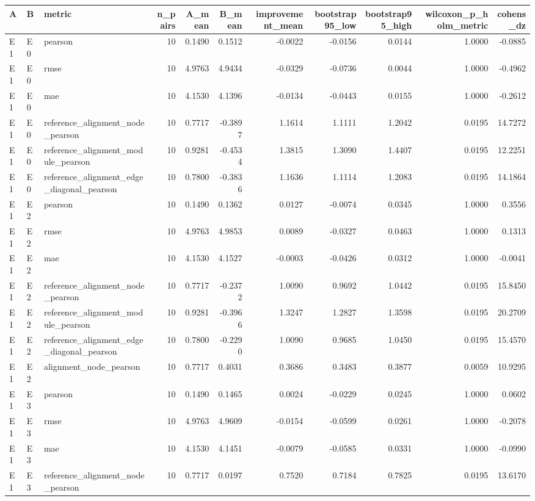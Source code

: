 \begin{tabular}{lllrrrrrrrr}
\toprule
A & B & metric & n_pairs & A_mean & B_mean & improvement_mean & bootstrap95_low & bootstrap95_high & wilcoxon_p_holm_metric & cohens_dz \\
\midrule
E1 & E0 & pearson & 10 & 0.1490 & 0.1512 & -0.0022 & -0.0156 & 0.0144 & 1.0000 & -0.0885 \\
E1 & E0 & rmse & 10 & 4.9763 & 4.9434 & -0.0329 & -0.0736 & 0.0044 & 1.0000 & -0.4962 \\
E1 & E0 & mae & 10 & 4.1530 & 4.1396 & -0.0134 & -0.0443 & 0.0155 & 1.0000 & -0.2612 \\
E1 & E0 & reference_alignment_node_pearson & 10 & 0.7717 & -0.3897 & 1.1614 & 1.1111 & 1.2042 & 0.0195 & 14.7272 \\
E1 & E0 & reference_alignment_module_pearson & 10 & 0.9281 & -0.4534 & 1.3815 & 1.3090 & 1.4407 & 0.0195 & 12.2251 \\
E1 & E0 & reference_alignment_edge_diagonal_pearson & 10 & 0.7800 & -0.3836 & 1.1636 & 1.1114 & 1.2083 & 0.0195 & 14.1864 \\
E1 & E2 & pearson & 10 & 0.1490 & 0.1362 & 0.0127 & -0.0074 & 0.0345 & 1.0000 & 0.3556 \\
E1 & E2 & rmse & 10 & 4.9763 & 4.9853 & 0.0089 & -0.0327 & 0.0463 & 1.0000 & 0.1313 \\
E1 & E2 & mae & 10 & 4.1530 & 4.1527 & -0.0003 & -0.0426 & 0.0312 & 1.0000 & -0.0041 \\
E1 & E2 & reference_alignment_node_pearson & 10 & 0.7717 & -0.2372 & 1.0090 & 0.9692 & 1.0442 & 0.0195 & 15.8450 \\
E1 & E2 & reference_alignment_module_pearson & 10 & 0.9281 & -0.3966 & 1.3247 & 1.2827 & 1.3598 & 0.0195 & 20.2709 \\
E1 & E2 & reference_alignment_edge_diagonal_pearson & 10 & 0.7800 & -0.2290 & 1.0090 & 0.9685 & 1.0450 & 0.0195 & 15.4570 \\
E1 & E2 & alignment_node_pearson & 10 & 0.7717 & 0.4031 & 0.3686 & 0.3483 & 0.3877 & 0.0059 & 10.9295 \\
E1 & E3 & pearson & 10 & 0.1490 & 0.1465 & 0.0024 & -0.0229 & 0.0245 & 1.0000 & 0.0602 \\
E1 & E3 & rmse & 10 & 4.9763 & 4.9609 & -0.0154 & -0.0599 & 0.0261 & 1.0000 & -0.2078 \\
E1 & E3 & mae & 10 & 4.1530 & 4.1451 & -0.0079 & -0.0585 & 0.0331 & 1.0000 & -0.0990 \\
E1 & E3 & reference_alignment_node_pearson & 10 & 0.7717 & 0.0197 & 0.7520 & 0.7184 & 0.7825 & 0.0195 & 13.6170 \\

\end{tabular}
